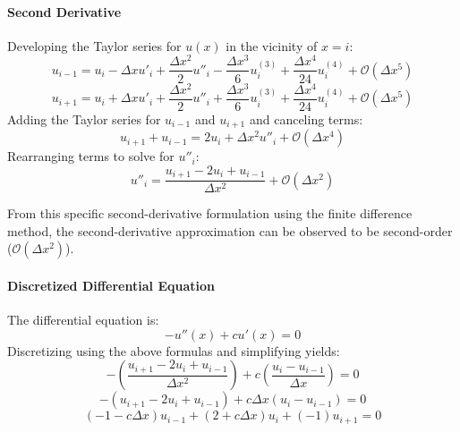 \documentclass[10pt, reqno]{article}		%
\numberwithin{equation}{section}
\begin{document}
\paragraph{Second Derivative}
Developing the Taylor series for $u(x)$ in the vicinity of $x = i$:
\begin{equation}
u_{i-1} = u_i - \Delta x u'_i + \frac{\Delta x^2}{2} u''_i - \frac{\Delta x^3}{6} u^{(3)}_i + \frac{\Delta x^4}{24} u^{(4)}_i + \mathcal{O}(\Delta x^5)
\end{equation}
\begin{equation}
u_{i+1} = u_i + \Delta x u'_i + \frac{\Delta x^2}{2} u''_i + \frac{\Delta x^3}{6} u^{(3)}_i + \frac{\Delta x^4}{24} u^{(4)}_i + \mathcal{O}(\Delta x^5)
\end{equation}
Adding the Taylor series for $u_{i-1}$ and $u_{i+1}$ and canceling terms:
\begin{equation}
u_{i+1} + u_{i-1} = 2u_i + \Delta x^2 u''_i + \mathcal{O}(\Delta x^4)
\end{equation}
Rearranging terms to solve for $u''_i$:
\begin{equation}
u''_i = \frac{u_{i+1} - 2u_i + u_{i-1}}{\Delta x^2} + \mathcal{O}(\Delta x^2) 
\end{equation}

From this specific second-derivative formulation using the finite difference method, the second-derivative approximation can be observed to be second-order ($\mathcal{O}(\Delta x^2)$).

\paragraph{Discretized Differential Equation}
The differential equation is:
\begin{equation}
- u''(x)+cu'(x)=0
\end{equation}
Discretizing using the above formulas and simplifying yields:
\begin{equation}
-\left(\frac{u_{i+1} - 2u_i + u_{i-1}}{\Delta x^2}\right) + c\left(\frac{u_i - u_{i-1}}{\Delta x}\right) = 0
\end{equation}
\begin{equation}
-\left(u_{i+1} - 2u_i + u_{i-1}\right) + c\Delta x\left(u_i - u_{i-1}\right) = 0
\end{equation}
\begin{equation}
\left(-1-c\Delta x\right)u_{i-1} + \left(2+c\Delta x\right)u_{i} + \left(-1\right)u_{i+1} = 0
\end{equation}
\end{document}
